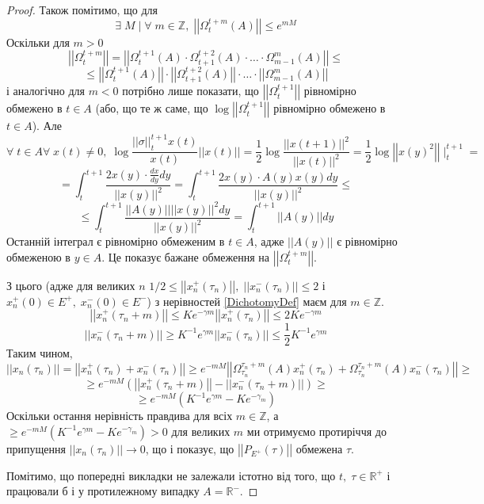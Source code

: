\documentclass[14pt]{extarticle} %
\let\oldforall\forall
\renewcommand{\forall}{\oldforall\;}
\let\oldexists\exists
\renewcommand{\exists}{\oldexists\;}
\newcommand{\mynorm}[1]{\left|\left|#1\right|\right|}
\begin{document}
\begin{proof}
	Також помітимо, що для 
	\[\exists M\mid\forall m\in\mathbb{Z},\;\mynorm{\Omega_t^{t+m}(A)}\leq e^{mM}\]
	Оскільки для $m>0$
	\[\mynorm{\Omega_t^{t+m}}=\mynorm{\Omega_t^{t+1}(A)\cdot\Omega_{t+1}^{t+2}(A)\cdot\hdots\cdot\Omega_{m-1}^{m}(A)}\leq\]
	\[\leq \mynorm{\Omega_t^{t+1}(A)}\cdot\mynorm{\Omega_{t+1}^{t+2}(A)}\cdot\hdots\cdot\mynorm{\Omega_{m-1}^{m}(A)}\]
	і аналогічно для $m<0$ потрібно лише показати, що $\mynorm{\Omega_t^{t+1}}$ рівномірно обмежено в $t\in A$ (або,
	що те ж саме, що $\log\mynorm{\Omega_t^{t+1}}$ рівномірно обмежено в $t\in A$). Але
	\[\forall t\in A\forall x(t)\neq 0,\; \log\frac{\mynorm\sigma_t^{t+1}x(t)}{x(t)}{\mynorm{x(t)}}=\frac{1}{2}\log\frac{\mynorm{x(t+1)}^2}
	{\mynorm{x(t)}^2}=\frac{1}{2}\log\mynorm{x(y)^2}\mid_t^{t+1}=\]
	\[=\int_t^{t+1}\frac{2 x(y)\cdot\frac{dx}{dy}dy}{\mynorm{x(y)}^2}=\int_t^{t+1}\frac{2 x(y)\cdot A(y)x(y)dy}{\mynorm{x(y)}^2}\leq\]
	\[\leq\int_t^{t+1}\frac{\mynorm{A(y)}\mynorm{x(y)}^2dy}{\mynorm{x(y)}^2}=\int_t^{t+1}\mynorm{A(y)}dy\]
	Останній інтеграл є рівномірно обмеженим в $t\in A$, адже $\mynorm{A(y)}$ є рівномірно обмеженою в $y\in A$. Це показує бажане обмеження
	на $\mynorm{\Omega_t^{t+m}}$.

	З цього (адже для великих $n$ $1/2\leq\mynorm{x_n^+(\tau_n)},\;\mynorm{x_n^-(\tau_n)}\leq 2$ і $x_n^+(0)\in E^+,\;x_n^-(0)\in E^-$) 
	з нерівностей \ref{DichotomyDef} маєм
	для $m\in\mathbb{Z}$.
	\[\mynorm{x_n^+(\tau_n+m)}\leq Ke^{-\gamma m}\mynorm{x_n^+(\tau_n)}\leq 2Ke^{-\gamma m}\]
	\[\mynorm{x_n^-(\tau_n+m)}\geq K^{-1}e^{\gamma m}\mynorm{x_n^-(\tau_n)}\leq \frac{1}{2}K^{-1}e^{\gamma m}\]
	Таким чином,
	\[\mynorm{x_n(\tau_n)}=
	\mynorm{x_n^+(\tau_n)+x_n^-(\tau_n)}\geq e^{-mM}\mynorm{\Omega^{\tau_n+m}_{\tau_n}(A)x_n^+(\tau_n)+
	\Omega^{\tau_n+m}_{\tau_n}(A)x_n^-(\tau_n)}\geq\]\[\geq e^{-mM}(\mynorm{x_n^+(\tau_n+m)}-\mynorm{x_n^-(\tau_n+m)})\geq\]
	\[\geq e^{-mM}(K^{-1}e^{\gamma m}-Ke^{-\gamma_m})\]
	Оскільки остання нерівність правдива для всіх $m\in\mathbb{Z}$, а $\geq e^{-mM}(K^{-1}e^{\gamma m}-Ke^{-\gamma_m})>0$ для великих
	$m$ ми отримуємо протиріччя до припущення $\mynorm{x_n(\tau_n)}\to 0$, що і показує, що $\mynorm{P_{E^+}(\tau)}$ обмежена $\tau$.

	Помітимо, що попередні викладки не залежали істотно від того, що $t,\;\tau\in\mathbb{R}^+$ і працювали б і у протилежному випадку $
	A=\mathbb{R}^-$. 


\end{proof}
\end{document}

